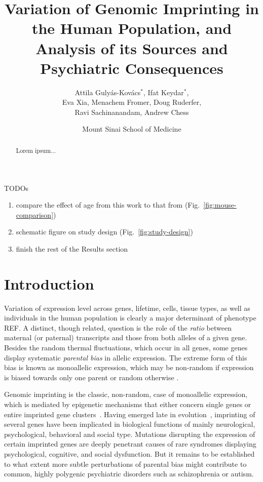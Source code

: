 \documentclass[letterpaper]{article}
\title{Variation of Genomic Imprinting in the Human Population,
and Analysis of its Sources and Psychiatric Consequences}
\author{Attila Guly\'{a}s-Kov\'{a}cs\(^\ast\), Ifat Keydar\(^\ast\),\\
Eva Xia, Menachem Fromer, Doug Ruderfer,\\
Ravi Sachinanandam, Andrew Chess}
\date{Mount Sinai School of Medicine}
\begin{document}
\maketitle

TODOs
\begin{enumerate}
\item compare the effect of age from this work to that from
\cite{Perez2015} (Fig.~\ref{fig:mouse-comparison})
\item schematic figure on study design (Fig.~\ref{fig:study-design}) 
\item finish the rest of the Results section
\end{enumerate}

\newpage

\maketitle

\begin{abstract}
Lorem ipsum...
\end{abstract}

\section{Introduction}

Variation of expression level across genes, lifetime, cells, tissue types, as
well as individuals in the human population is clearly a major determinant of
phenotype REF.  A distinct, though related, question is the role of the
\emph{ratio} between maternal (or paternal) transcripts and those from both
alleles of a given gene.  Besides the random thermal fluctuations, which occur
in all genes, some genes display systematic \emph{parental bias} in allelic
expression.  The extreme form of this bias is known as monoallelic expression,
which may be non-random if expression is biased towards only one parent or
random otherwise \cite{Chess2012}.

Genomic imprinting is the classic, non-random, case of monoallelic expression,
which is mediated by epigenetic mechanisms that either concern single genes or
entire imprinted gene clusters~\cite{Peters2014,Plasschaert2014}.  Having
emerged late in evolution~\cite{Tucci2016}, imprinting of several genes have
been implicated in biological functions of mainly neurological, psychological,
behavioral and social type.  Mutations disrupting the expression of certain
imprinted genes are deeply penetrant causes of rare syndromes displaying
psychological, cognitive, and social dysfunction.  But it remains to be
established to what extent more subtle perturbations of parental bias might
contribute to common, highly polygenic psychiatric disorders such as
schizophrenia or autism.
\end{document}
